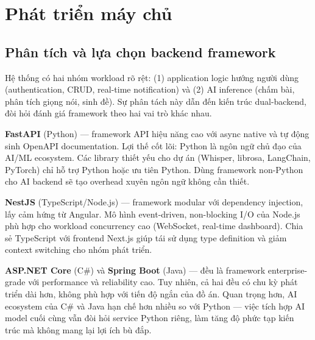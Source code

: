\section{Phát triển máy chủ}
\subsection{Phân tích và lựa chọn backend framework}

Hệ thống có hai nhóm workload rõ rệt: (1) application logic hướng người dùng (authentication, CRUD, real-time notification) và (2) AI inference (chấm bài, phân tích giọng nói, sinh đề). Sự phân tách này dẫn đến kiến trúc dual-backend, đòi hỏi đánh giá framework theo hai vai trò khác nhau.

\textbf{FastAPI} (Python) --- framework API hiệu năng cao với async native và tự động sinh OpenAPI documentation. Lợi thế cốt lõi: Python là ngôn ngữ chủ đạo của AI/ML ecosystem. Các library thiết yếu cho dự án (Whisper, librosa, LangChain, PyTorch) chỉ hỗ trợ Python hoặc ưu tiên Python. Dùng framework non-Python cho AI backend sẽ tạo overhead xuyên ngôn ngữ không cần thiết. \cite{fastapi}

\textbf{NestJS} (TypeScript/Node.js) --- framework modular với dependency injection, lấy cảm hứng từ Angular. Mô hình event-driven, non-blocking I/O của Node.js phù hợp cho workload concurrency cao (WebSocket, real-time dashboard). Chia sẻ TypeScript với frontend Next.js giúp tái sử dụng type definition và giảm context switching cho nhóm phát triển. \cite{nestjs}

\textbf{ASP.NET Core} (C\#) và \textbf{Spring Boot} (Java) --- đều là framework enterprise-grade với performance và reliability cao. Tuy nhiên, cả hai đều có chu kỳ phát triển dài hơn, không phù hợp với tiến độ ngắn của đồ án. Quan trọng hơn, AI ecosystem của C\# và Java hạn chế hơn nhiều so với Python --- việc tích hợp AI model cuối cùng vẫn đòi hỏi service Python riêng, làm tăng độ phức tạp kiến trúc mà không mang lại lợi ích bù đắp. \cite{aspnet, springboot}


